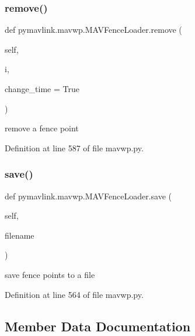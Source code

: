 \subsubsection{\texorpdfstring{remove()}{remove()}}
{\footnotesize\ttfamily def pymavlink.\+mavwp.\+M\+A\+V\+Fence\+Loader.\+remove (\begin{DoxyParamCaption}\item[{}]{self,  }\item[{}]{i,  }\item[{}]{change\+\_\+time = {\ttfamily True} }\end{DoxyParamCaption})}

\begin{DoxyVerb}remove a fence point\end{DoxyVerb}
 

Definition at line 587 of file mavwp.\+py.

\mbox{\label{classpymavlink_1_1mavwp_1_1MAVFenceLoader_a34fdb2bc4e79b7649714adb5d0bfd667}} 
\subsubsection{\texorpdfstring{save()}{save()}}
{\footnotesize\ttfamily def pymavlink.\+mavwp.\+M\+A\+V\+Fence\+Loader.\+save (\begin{DoxyParamCaption}\item[{}]{self,  }\item[{}]{filename }\end{DoxyParamCaption})}

\begin{DoxyVerb}save fence points to a file\end{DoxyVerb}
 

Definition at line 564 of file mavwp.\+py.



\subsection{Member Data Documentation}
\mbox{\label{classpymavlink_1_1mavwp_1_1MAVFenceLoader_a9d2edef837016a734557e430f25b3158}} 
